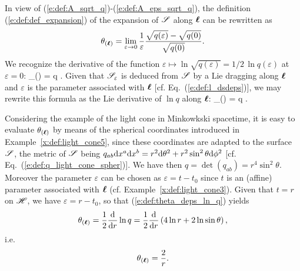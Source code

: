 In view of (\ref{e:def:A_sqrt_q})-(\ref{e:def:A_eps_sqrt_q}), the definition (\ref{e:def:def_expansion})
of the expansion of $\mathscr{S}$ along $\bm{\ell}$ can be rewritten as
\[
    \theta_{(\bm{\ell})} = \lim_{\varepsilon\rightarrow 0} \frac{1}{\varepsilon}
    \frac{\sqrt{q(\varepsilon)} - \sqrt{q(0)}}{\sqrt{q(0)}} .
\]
We recognize the derivative of the function $\varepsilon \mapsto \ln \sqrt{q(\varepsilon)}=
1/2\, \ln q(\varepsilon)$ at $\varepsilon=0$:
\be \label{e:def:theta_deps_ln_q}
     \theta_{(\wl)} =  \frac{\D}{\D\varepsilon}  \ln q .
\ee
Given that $\mathscr{S}_\varepsilon$ is deduced from $\mathscr{S}$ by a Lie dragging along $\bm{\ell}$
and $\varepsilon$ is the parameter associated with $\bm{\ell}$ [cf. Eq.~(\ref{e:def:l_dsdeps})], we may
rewrite this formula as the Lie derivative of $\ln q$ along $\bm{\ell}$:
\be \label{e:def:theta_Lie_ln_q}
    \theta_{(\wl)} =  \Lie{\el} \ln q .
\ee
\begin{example} \label{x:def:light_cone6}
Considering the example of the light cone in Minkowkski spacetime,
it is easy to evaluate $\theta_{(\bm{\ell})}$ by means of the spherical coordinates
introduced in Example~\ref{x:def:light_cone5}, since these coordinates are adapted to the
surface $\mathscr{S}$, the metric of $\mathscr{S}$ being $q_{ab} \mathrm{d} x^a \mathrm{d} x^b = r^2 \mathrm{d} \theta^2
+ r^2\sin^2\theta \mathrm{d} \phi^2$ [cf. Eq.~(\ref{e:def:q_light_cone_spher})].
We have then  $q = \det(q_{ab}) = r^4\sin^2\theta$. Moreover the parameter $\varepsilon$
can be chosen as $\varepsilon = t - t_0$ since $t$ is an (affine) parameter
associated with $\bm{\ell}$ (cf. Example~\ref{x:def:light_cone3}). Given that
$t=r$ on $\mathscr{H}$, we have $\varepsilon = r - t_0$, so that (\ref{e:def:theta_deps_ln_q})
yields
\[
    \theta_{(\bm{\ell})} = \frac{1}{2} \frac{\mathrm{d}}{\mathrm{d} r}  \ln q =
         \frac{1}{2} \frac{\mathrm{d}}{\mathrm{d} r} \left( 4 \ln r + 2 \ln\sin\theta \right) ,
\]
i.e.
\[
    \theta_{(\bm{\ell})} = \frac{2}{r} .
\]
\end{example}


